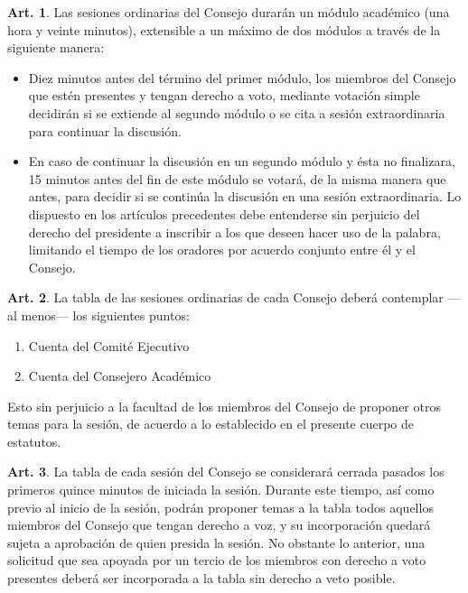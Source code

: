 \documentclass[letterpaper,11pt]{article}
\theoremstyle{definition}%
\newtheorem{art}{Art.} %
\begin{document}
\begin{art}\label{duracionConsejosOrdinarios}
	Las sesiones ordinarias del Consejo durarán un módulo académico (una hora y veinte minutos), extensible a un máximo de dos módulos a través de la siguiente manera:
	\begin{itemize}
		\item Diez minutos antes del término del primer módulo, los miembros del Consejo que estén presentes y tengan derecho a voto, mediante votación simple decidirán si se extiende al segundo módulo o se cita a sesión extraordinaria para continuar la discusión.
		\item En caso de continuar la discusión en un segundo módulo y ésta no finalizara, 15 minutos antes del fin de este módulo se votará, de la misma manera que antes, para decidir si se continúa la discusión en una sesión extraordinaria. Lo dispuesto en los artículos precedentes debe entenderse sin perjuicio del derecho del presidente a inscribir a los que deseen hacer uso de la palabra, limitando el tiempo de los oradores por acuerdo conjunto entre él y el Consejo.
	\end{itemize}
\end{art}

\begin{art}\label{cuentasPublicasOrdinarias}
	La tabla de las sesiones ordinarias de cada Consejo deberá contemplar ---al menos--- los siguientes puntos:
	\begin{enumerate}
		\item Cuenta del Comité Ejecutivo
		\item Cuenta del Consejero Académico
	\end{enumerate}
	Esto sin perjuicio a la facultad de los miembros del Consejo de proponer otros temas para la sesión, de acuerdo a lo establecido en el presente cuerpo de estatutos.
\end{art}

\begin{art}\label{definicionTabla}
	La tabla de cada sesión del Consejo se considerará cerrada pasados los primeros quince minutos de iniciada la sesión. Durante este tiempo, así como previo al inicio de la sesión, podrán proponer temas a la tabla todos aquellos miembros del Consejo que tengan derecho a voz, y su incorporación quedará sujeta a aprobación de quien presida la sesión. No obstante lo anterior, una solicitud que sea apoyada por un tercio de los miembros con derecho a voto presentes deberá ser incorporada a la tabla sin derecho a veto posible.
\end{art}
\end{document}
